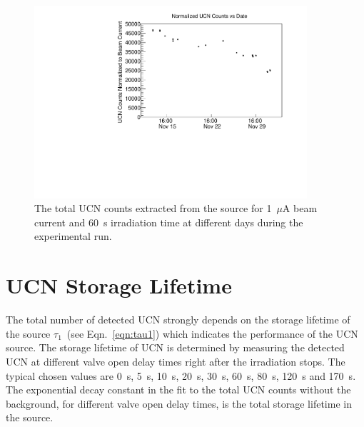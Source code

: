 \begin{figure}[h]
  \centering
  \includegraphics[width=0.9\textwidth]{UCNCounts_vs_time.pdf}
  \caption[ UCN yield at 1~$\mu$A beam current and 60~s target
  irradiation over experimental run]{The total UCN counts extracted
    from the source for 1~$\mu$A beam current and 60~s irradiation
    time at different days during the experimental run. }
  \label{fig:UCNCounts_time}
\end{figure}

\section{UCN Storage Lifetime~\label{storagelifetime}}

The total number of detected UCN strongly depends on the storage
lifetime of the source $\tau_1$~(see Eqn.~\ref{eqn:tau1}) which
indicates the performance of the UCN source. The storage lifetime of
UCN is determined by measuring the detected UCN at different valve
open delay times right after the irradiation stops.  The typical
chosen values are 0~s, 5~s, 10~s, 20~s, 30~s, 60~s, 80~s, 120~s and
170~s.
The exponential decay constant in the fit to the total UCN counts
without the background, for different valve open delay times, is the
total storage lifetime in the source.

